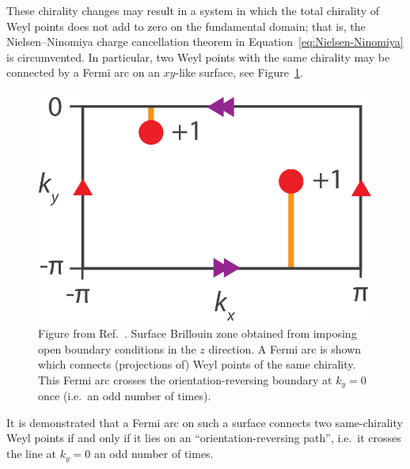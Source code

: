 These chirality changes may result in a system in which the total chirality of Weyl points does not add to zero on the fundamental domain; that is, the Nielsen--Ninomiya charge cancellation theorem in Equation~\eqref{eq:Nielsen-Ninomiya} is circumvented. In particular, two Weyl points with the same chirality may be connected by a Fermi arc on an $xy$-like surface, see Figure~\ref{fig:same-chirality}.
\begin{figure}[htb!]
	\centering
	\includegraphics[width=.5\linewidth]{Images/same-chirality}
	\caption{Figure from Ref.~\cite{Fonseca-Vaidya_nonorientable}. Surface Brillouin zone obtained from imposing open boundary conditions in the $z$ direction. A Fermi arc is shown which connects (projections of) Weyl points of the same chirality. This Fermi arc crosses the orientation-reversing boundary at $k_y=0$ once (i.e.\ an odd number of times).}
	\label{fig:same-chirality}
\end{figure}
It is demonstrated that a Fermi arc on such a surface connects two same-chirality Weyl points if and only if it lies on an ``orientation-reversing path'', i.e.\ it crosses the line at $k_y=0$ an odd number of times.

